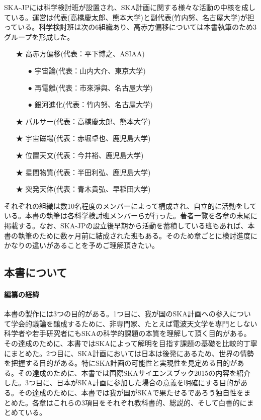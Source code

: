 SKA-JPには科学検討班が設置され、SKA計画に関する様々な活動の中核を成している。運営は代表(高橋慶太郎、熊本大学)と副代表(竹内努、名古屋大学)が担っている。科学検討班は次の6組織あり、高赤方偏移については本書執筆のため3グループを形成した。
\begin{itemize}
\item[★] 高赤方偏移(代表：平下博之、ASIAA)
\begin{itemize}
\item[●] 宇宙論(代表：山内大介、東京大学)
\item[●] 再電離(代表：市來淨與、名古屋大学)
\item[●] 銀河進化(代表：竹内努、名古屋大学)
\end{itemize}
\item[★] パルサー(代表：高橋慶太郎、熊本大学)
\item[★] 宇宙磁場(代表：赤堀卓也、鹿児島大学)
\item[★] 位置天文(代表：今井裕、鹿児島大学)
\item[★] 星間物質(代表：半田利弘、鹿児島大学)
\item[★] 突発天体(代表：青木貴弘、早稲田大学)
\end{itemize}
それぞれの組織は数10名程度のメンバーによって構成され、自立的に活動をしている。本書の執筆は各科学検討班メンバーらが行った。著者一覧を各章の末尾に掲載する。なお、SKA-JPの設立後早期から活動を蓄積している班もあれば、本書の執筆のために数ヶ月前に結成された班もある。そのため章ごとに検討進度にかなりの違いがあることを予めご理解頂きたい。

\subsection{本書について}
\label{c01.s3.ss2}

\paragraph{編纂の経緯}

本書の製作には3つの目的がある。1つ目に、我が国のSKA計画への参入について学会的議論を醸成するために、非専門家、たとえば電波天文学を専門としない科学者や若手研究者にもSKAの科学的課題の本質を理解して頂く目的がある。その達成のために、本書ではSKAによって解明を目指す課題の基礎を比較的丁寧にまとめた。2つ目に、SKA計画においては日本は後発にあるため、世界の情勢を把握する目的がある。特にSKA計画の可能性と実現性を見定める目的がある。その達成のために、本書では国際SKAサイエンスブック2015の内容を紹介した。3つ目に、日本がSKA計画に参加した場合の意義を明確にする目的がある。その達成のために、本書では我が国がSKAで果たせるであろう独自性をまとめた。各章はこれらの3項目をそれぞれ教科書的、総説的、そして白書的にまとめている。

